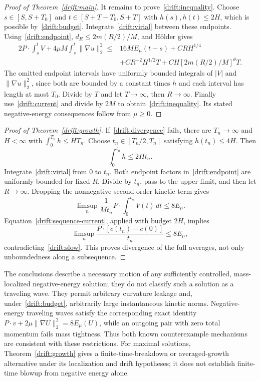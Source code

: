 \begin{proof}[Proof of Theorem~\ref{drift:main}]
It remains to prove~\eqref{drift:inequality}. Choose
$s\in[S,S+T_0]$ and $t\in[S+T-T_0,S+T]$ with $h(s),h(t)\le2H$, which is possible by~\eqref{drift:budget}. Integrate~\eqref{drift:virial} between these endpoints. Using~\eqref{drift:endpoint}, $d_R\le2m(R/2)/M$, and H\"older gives
\begin{align*}
 2P\cdot\int_s^t V
 +4\mu M\int_s^t\|\nabla u\|_2^2
 \le{}&16ME_\mu(t-s)+C R H^{1/4}\\
 &+C R^{-2}H^{1/2}T
 +C H[2m(R/2)/M]^\theta T.
\end{align*}
The omitted endpoint intervals have uniformly bounded integrals of $|V|$ and $\|\nabla u\|_2^2$, since both are bounded by a constant times $h$ and each interval has length at most $T_0$. Divide by $T$ and let $T\to\infty$, then $R\to\infty$. Finally use~\eqref{drift:current} and divide by $2M$ to obtain~\eqref{drift:inequality}. Its stated negative-energy consequences follow from $\mu\ge0$.
\end{proof}

\begin{proof}[Proof of Theorem~\ref{drift:growth}]
If~\eqref{drift:divergence} fails, there are $T_n\to\infty$ and $H<\infty$ with $\int_0^{T_n}h\le H T_n$. Choose $t_n\in[T_n/2,T_n]$ satisfying $h(t_n)\le4H$. Then
\[
 \int_0^{t_n}h\le2H t_n.
\]
Integrate~\eqref{drift:virial} from $0$ to $t_n$. Both endpoint factors in~\eqref{drift:endpoint} are uniformly bounded for fixed $R$. Divide by $t_n$, pass to the upper limit, and then let $R\to\infty$. Dropping the nonnegative second-order kinetic term gives
\[
 \limsup_n\frac1{M t_n}P\cdot\int_0^{t_n}V(t)\,dt\le8E_\mu.
\]
Equation~\eqref{drift:sequence-current}, applied with budget $2H$, implies
\[
 \limsup_n\frac{P\cdot[c(t_n)-c(0)]}{t_n}\le8E_\mu,
\]
contradicting~\eqref{drift:slow}. This proves divergence of the full averages, not only unboundedness along a subsequence.
\end{proof}

\begin{remark}
The conclusions describe a necessary motion of any sufficiently controlled, mass-localized negative-energy solution; they do not classify such a solution as a traveling wave. They permit arbitrary curvature leakage and, under~\eqref{drift:budget}, arbitrarily large instantaneous kinetic norms. Negative-energy traveling waves satisfy the corresponding exact identity
$P\cdot v+2\mu\|\nabla U\|_2^2=8E_\mu(U)$, while an outgoing pair with zero total momentum fails mass tightness. Thus both known counterexample mechanisms are consistent with these restrictions. For maximal solutions, Theorem~\ref{drift:growth} gives a finite-time-breakdown or averaged-growth alternative under its localization and drift hypotheses; it does not establish finite-time blowup from negative energy alone.
\end{remark}
